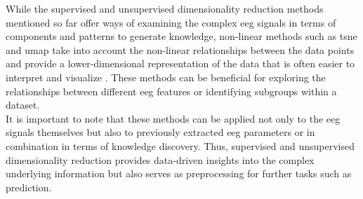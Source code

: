 While the supervised and unsupervised dimensionality reduction methods mentioned so far offer ways of examining the complex \gls{eeg} signals in terms of components and patterns to generate knowledge, non-linear methods such as \gls{tsne} and \gls{umap} take into account the non-linear relationships between the data points and provide a lower-dimensional representation of the data that is often easier to interpret and visualize \cite{Mcinnes2018}. These methods can be beneficial for exploring the relationships between different \gls{eeg} features or identifying subgroups within a dataset.\\
It is important to note that these methods can be applied not only to the \gls{eeg} signals themselves but also to previously extracted \gls{eeg} parameters or in combination in terms of knowledge discovery. Thus, supervised and unsupervised dimensionality reduction provides data-driven insights into the complex underlying information but also serves as preprocessing for further tasks such as prediction.

